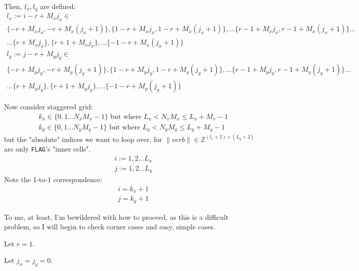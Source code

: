 \documentclass[10pt]{amsart}
\begin{document}
\begin{multicols*}{2}
Then, $l_x,l_y$ are defined:
\begin{equation}
\begin{gathered}
	l_x:= i-r+M_xj_x \in \\
	\lbrace -r+M_xj_x, -r+M_x(j_x+1) \rbrace , 	\lbrace 1-r+M_xj_x, 1-r+M_x(j_x+1) \rbrace , \dots \lbrace r-1+M_xj_x , r-1 + M_x(j_x +1)\rbrace \dots \\
\dots  \lbrace r + M_xj_x \rbrace , 	\lbrace r+1+M_xj_x \rbrace , \dots 	\lbrace -1-r + M_x(j_x+1) \rbrace 
\end{gathered}
\end{equation}
\begin{equation}
\begin{gathered}
	l_y:= j-r+M_yj_y \in \\
	\lbrace -r+M_yj_y, -r+M_y(j_y+1) \rbrace , 	\lbrace 1-r+M_yj_y, 1-r+M_y(j_y+1) \rbrace , \dots \lbrace r-1+M_yj_y , r-1 + M_y(j_y +1)\rbrace \dots \\
\dots  \lbrace r + M_yj_y \rbrace , 	\lbrace r+1+M_yj_y \rbrace , \dots 	\lbrace -1-r + M_y(j_y+1) \rbrace 
\end{gathered}
\end{equation}

Now consider staggered grid:
\[
\begin{aligned}
&	k_x \in \lbrace 0 ,1\dots N_xM_x-1\rbrace \text{ but where } L_x < N_x M_x \leq L_x+M_x-1 \\ 
&	k_y \in \lbrace 0 ,1\dots N_yM_y-1\rbrace \text{ but where } L_y < N_y M_y \leq L_y+M_y-1 
\end{aligned}
\]
but the "absolute" indices we want to loop over, for $\|verb \| \in \mathbb{Z}^{(l_x+2)\times (L_y+2)}$ are only \verb|FLAG|'s "inner cells".  
\[
\begin{aligned}
	& i := 1,2\dots L_x \\ 
	& j := 1,2\dots L_y 
\end{aligned}
\]
Note the 1-to-1 correspondence: 
\[
\begin{aligned}
	& i = k_x +1 \\ 
	& j= k_y +1
\end{aligned}
\]

To me, at least, I'm bewildered with how to proceed, as this is a difficult problem, so I will begin to check corner cases and easy, simple cases.  

Let $r=1$.  

Let $j_x=j_y=0$.  


\end{multicols*}
\end{document}
